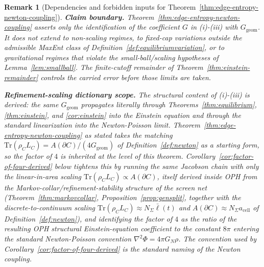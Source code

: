 \documentclass[11pt]{article}
\newtheorem{remark}[theorem]{Remark}
\begin{document}
\begin{remark}[Dependencies and forbidden inputs for Theorem~\ref{thm:edge-entropy-newton-coupling}]
\textbf{Claim boundary.} Theorem~\ref{thm:edge-entropy-newton-coupling} asserts only the identification of the coefficient \(G\) in (i)-(iii) with \(G_{\mathrm{geom}}\). It does not extend to non-scaling regimes, to fixed-cap variations outside the admissible MaxEnt class of Definition~\ref{def:equilibriumvariation}, or to gravitational regimes that violate the small-ball/scaling hypotheses of Lemma~\ref{lem:smallball}. The finite-cutoff remainder of Theorem~\ref{thm:einstein-remainder} controls the carried error before those limits are taken.

\textbf{Refinement-scaling dictionary scope.} The structural content of (i)-(iii) is derived: the same \(G_{\mathrm{geom}}\) propagates literally through Theorems~\ref{thm:equilibrium}, \ref{thm:einstein}, and \ref{cor:einstein} into the Einstein equation and through the standard linearization into the Newton-Poisson limit. Theorem~\ref{thm:edge-entropy-newton-coupling} as stated takes the matching \(\mathrm{Tr}(\rho_C L_C)=A(\partial C)/(4G_{\mathrm{geom}})\) of Definition~\ref{def:newton} as a starting form, so the factor of \(4\) is inherited at the level of this theorem. Corollary~\ref{cor:factor-of-four-derived} below tightens this by running the same Jacobson chain with only the linear-in-area scaling \(\mathrm{Tr}(\rho_C L_C)\propto A(\partial C)\), itself derived inside OPH from the Markov-collar/refinement-stability structure of the screen net (Theorem~\ref{thm:markovcollar}, Proposition~\ref{prop:gensplit}, together with the discrete-to-continuum scaling \(\mathrm{Tr}(\rho_C L_C)\approx N_\Sigma\bar\ell(t)\) and \(A(\partial C)\approx N_\Sigma a_{\mathrm{cell}}\) of Definition~\ref{def:newton}), and identifying the factor of \(4\) as the ratio of the resulting OPH structural Einstein-equation coefficient to the constant \(8\pi\) entering the standard Newton-Poisson convention \(\nabla^2\Phi=4\pi G_N\rho\). The convention used by Corollary~\ref{cor:factor-of-four-derived} is the standard naming of the Newton coupling.
\end{remark}
\end{document}
